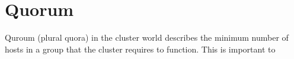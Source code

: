 % 

\section{Quorum}
Quroum (plural quora) in the cluster world describes the minimum number
of hosts in a group that the cluster requires to function. This is important to 
